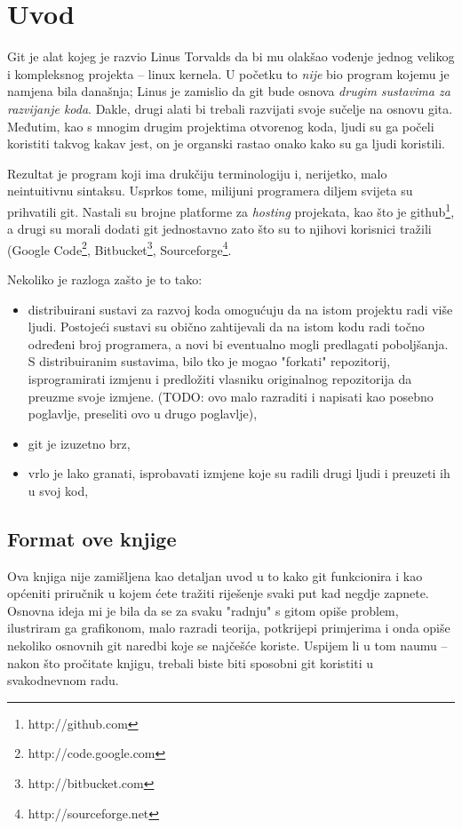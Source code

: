 \chapter*{Uvod}

Git je alat kojeg je razvio Linus Torvalds da bi mu olakšao vođenje jednog velikog i kompleksnog projekta -- linux kernela.
U početku to \emph{nije} bio program kojemu je namjena bila današnja; Linus je zamislio da git bude osnova \emph{drugim sustavima za razvijanje koda}.
Dakle, drugi alati bi trebali razvijati svoje sučelje na osnovu gita.
Međutim, kao s mnogim drugim projektima otvorenog koda, ljudi su ga počeli koristiti takvog kakav jest, on je organski rastao onako kako su ga ljudi koristili.

Rezultat je program koji ima drukčiju terminologiju i, nerijetko, malo neintuitivnu sintaksu. Usprkos tome, milijuni programera diljem svijeta su prihvatili git. 
Nastali su brojne platforme za \emph{hosting} projekata, kao što je github\footnote{http://github.com}, a drugi su morali dodati git jednostavno zato što su to njihovi korisnici tražili (Google Code\footnote{http://code.google.com}, Bitbucket\footnote{http://bitbucket.com}, Sourceforge\footnote{http://sourceforge.net}.

Nekoliko je razloga zašto je to tako:

\begin{itemize}
	\item distribuirani sustavi za razvoj koda omogućuju da na istom projektu radi više ljudi. Postojeći sustavi su obično zahtijevali da na istom kodu radi točno određeni broj programera, a novi bi eventualno mogli predlagati poboljšanja. S distribuiranim sustavima, bilo tko je mogao "forkati" repozitorij, isprogramirati izmjenu i predložiti vlasniku originalnog repozitorija da preuzme svoje izmjene. (TODO: ovo malo razraditi i napisati kao posebno poglavlje, preseliti ovo u drugo poglavlje),
	\item git je izuzetno brz,
	\item vrlo je lako granati, isprobavati izmjene koje su radili drugi ljudi i preuzeti ih u svoj kod,
\end{itemize}

\section*{Format ove knjige}

Ova knjiga nije zamišljena kao detaljan uvod u to kako git funkcionira i kao općeniti priručnik u kojem ćete tražiti riješenje svaki put kad negdje zapnete.
Osnovna ideja mi je bila da se za svaku "radnju" s gitom opiše problem, ilustriram ga grafikonom, malo razradi teorija, potkrijepi primjerima i onda opiše nekoliko osnovnih git naredbi koje se najčešće koriste.
Uspijem li u tom naumu -- nakon što pročitate knjigu, trebali biste biti sposobni git koristiti u svakodnevnom radu. 

